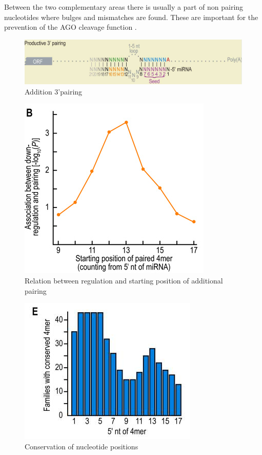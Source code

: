 \documentclass[12pt]{article}
\begin{document}
Between the two complementary areas there is usually a part of non pairing nucleotides where bulges and mismatches are found. These are important for the prevention of the AGO cleavage function \cite{Filipowicz}.

\begin{figure}
\centering
\includegraphics[scale=0.3]{results/additional_pairing.PNG}
\caption{Addition 3'pairing}
\label{addipairing}
\end{figure}

\begin{figure}
\centering
\includegraphics[scale=0.4]{results/sites_regulation.PNG} 
\caption{Relation between regulation and starting position of additional pairing}
\label{siteregulation}
\end{figure}

\begin{figure}
\centering
\includegraphics[scale=0.5]{results/sites_conserved.PNG} 
\caption{Conservation of nucleotide positions}
\label{conserved}
\end{figure}
\end{document}
